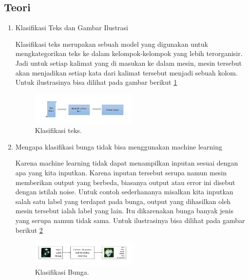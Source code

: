 \subsection{Teori}
\begin{enumerate}
\item Klasifikasi Teks dan Gambar Ilustrasi \par
Klasifikasi teks merupakan sebuah model yang digunakan untuk mengkategorikan teks ke dalam kelompok-kelompok yang lebih terorganisir. Jadi untuk setiap kalimat yang di masukan ke dalam mesin, mesin tersebut akan menjadikan setiap kata dari kalimat tersebut menjadi sebuah kolom. Untuk ilustrasinya bisa dilihat pada gambar berikut \ref{Teks1}
		\begin{figure}[ht]
		\centerline{\includegraphics[width=0.5\textwidth]{figures/im/teks1.png}}
		\caption{Klasifikasi teks.}
		\label{Teks1}
		\end{figure}

\item Mengapa klasifikasi bunga tidak bisa menggunakan machine learning \par
Karena machine learning tidak dapat menampilkan inputan sesuai dengan apa yang kita inputkan. Karena inputan tersebut serupa namun mesin memberikan output yang berbeda, biasanya output atau error ini disebut dengan istilah noise. Untuk contoh sederhananya misalkan kita inputkan salah satu label yang terdapat pada bunga, output yang dihasilkan oleh mesin tersebut ialah label yang lain. Itu dikarenakan bunga banyak jenis yang serupa namun tidak sama. Untuk ilustrasinya bisa dilihat pada gambar berikut \ref{Teks2}
		\begin{figure}[ht]
		\centerline{\includegraphics[width=0.5\textwidth]{figures/im/teks2.png}}
		\caption{Klasifikasi Bunga.}
		\label{Teks2}
		\end{figure}


\end{enumerate}
